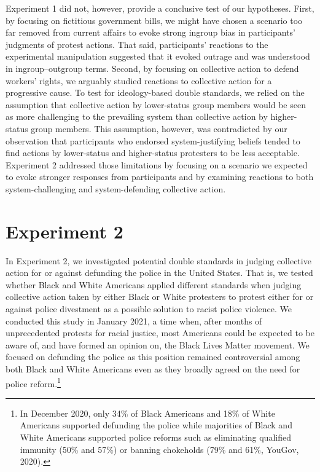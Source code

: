 \documentclass[twocolumn, 11pt, letterpaper]{article}
\begin{document}
Experiment 1 did not, however, provide a conclusive test of our
hypotheses. First, by focusing on fictitious government bills, we might
have chosen a scenario too far removed from current affairs to evoke
strong ingroup bias in participants' judgments of protest actions. That
said, participants' reactions to the experimental manipulation suggested
that it evoked outrage and was understood in ingroup--outgroup terms.
Second, by focusing on collective action to defend workers' rights, we
arguably studied reactions to collective action for a progressive cause.
To test for ideology-based double standards, we relied on the assumption
that collective action by lower-status group members would be seen as
more challenging to the prevailing system than collective action by
higher-status group members. This assumption, however, was contradicted
by our observation that participants who endorsed system-justifying
beliefs tended to find actions by lower-status and higher-status
protesters to be less acceptable. Experiment 2 addressed those
limitations by focusing on a scenario we expected to evoke stronger
responses from participants and by examining reactions to both
system-challenging and system-defending collective action.

\hypertarget{experiment-2}{%
\section{Experiment 2}\label{experiment-2}}

In Experiment 2, we investigated potential double standards in judging
collective action for or against defunding the police in the United
States. That is, we tested whether Black and White Americans applied
different standards when judging collective action taken by either Black
or White protesters to protest either for or against police divestment
as a possible solution to racist police violence. We conducted this
study in January 2021, a time when, after months of unprecedented
protests for racial justice, most Americans could be expected to be
aware of, and have formed an opinion on, the Black Lives Matter
movement. We focused on defunding the police as this position remained
controversial among both Black and White Americans even as they broadly
agreed on the need for police reform.\footnote{In December 2020, only
  34\% of Black Americans and 18\% of White Americans supported
  defunding the police while majorities of Black and White Americans
  supported police reforms such as eliminating qualified immunity (50\%
  and 57\%) or banning chokeholds (79\% and 61\%, YouGov, 2020).}
\end{document}
